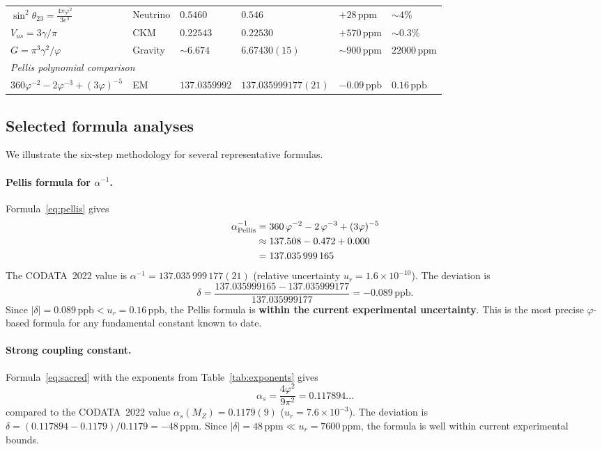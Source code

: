 \documentclass[11pt,a4paper]{article}
\newcommand{\vp}{\varphi}
\newcommand{\ppm}{\,\mathrm{ppm}}
\newcommand{\ppb}{\,\mathrm{ppb}}
\begin{document}
\begin{table}[H]
\begin{tabular}{@{}p{4.2cm}lllll@{}}
$\sin^{2}\!\theta_{23}=\frac{4\pi\vp^{2}}{3e^{3}}$ & Neutrino & $0.5460$ & $0.546$ & $+28\ppm$ & $\sim 4\%$ \\
$V_{us}=3\gamma/\pi$ & CKM & $0.22543$ & $0.22530$ & $+570\ppm$ & $\sim 0.3\%$ \\
$G=\pi^{3}\gamma^{2}/\vp$ & Gravity & ${\sim}6.674$ & $6.67430(15)$ & ${\sim}900\ppm$ & $22000\ppm$ \\
\midrule
\multicolumn{6}{l}{\textit{Pellis polynomial comparison}} \\[3pt]
$360\vp^{-2}{-}2\vp^{-3}{+}(3\vp)^{-5}$ & EM & $137.0359992$ & $137.035999177(21)$ & $-0.09\ppb$ & $0.16\ppb$ \\
\bottomrule
\end{tabular}
\end{table}

\subsection{Selected formula analyses}

We illustrate the six-step methodology for several representative formulas.

\paragraph{Pellis formula for $\alpha^{-1}$.}
Formula~\eqref{eq:pellis} gives
\begin{align}
  \alpha^{-1}_{\mathrm{Pellis}} &= 360\,\vp^{-2} - 2\,\vp^{-3} + (3\vp)^{-5} \notag\\
  &\approx 137.508 - 0.472 + 0.000 \notag\\
  &= 137.035\,999\,165 \label{eq:pellis-num}
\end{align}
The CODATA~2022 value is $\alpha^{-1}=137.035\,999\,177(21)$
(relative uncertainty $u_r = 1.6\times 10^{-10}$). The deviation is
\[
  \delta = \frac{137.035999165 - 137.035999177}{137.035999177} = -0.089\ppb.
\]
Since $|\delta|=0.089\ppb < u_r = 0.16\ppb$, the Pellis formula is
\textbf{within the current experimental uncertainty}. This is the most precise
$\vp$-based formula for any fundamental constant known to date.

\paragraph{Strong coupling constant.}
Formula~\eqref{eq:sacred} with the exponents from Table~\ref{tab:exponents}
gives
\begin{equation}
  \alpha_s = \frac{4\vp^{2}}{9\pi^{2}} = 0.117894\ldots
  \label{eq:alphas}
\end{equation}
compared to the CODATA~2022 value $\alpha_s(M_Z) = 0.1179(9)$
($u_r = 7.6\times 10^{-3}$). The deviation is
$\delta = (0.117894-0.1179)/0.1179 = -48\ppm$. Since
$|\delta|=48\ppm \ll u_r = 7600\ppm$, the formula is well within current
experimental bounds.
\end{document}
